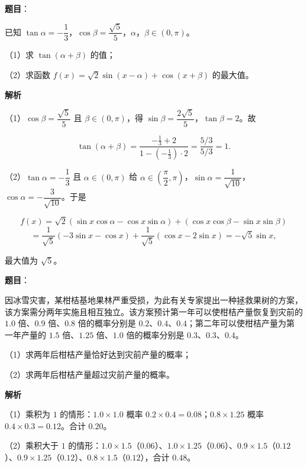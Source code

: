 \begin{answer}

\textbf{题目}：

已知 $\tan\alpha=-\dfrac13$，$\cos\beta=\dfrac{\sqrt5}5$，$\alpha$，$\beta\in(0,\pi)$。

（1）求 $\tan(\alpha+\beta)$ 的值；

（2）求函数 $f(x)=\sqrt2\sin(x-\alpha)+\cos(x+\beta)$ 的最大值。

\textbf{解析}

（1）$\cos\beta=\dfrac{\sqrt5}5$ 且 $\beta\in(0,\pi)$，得 $\sin\beta=\dfrac{2\sqrt5}5$，$\tan\beta=2$。故

\nopagebreak[4]
\[\tan(\alpha+\beta)=\frac{-\frac13+2}{1-\left(-\frac13\right)\cdot2}=\frac{5/3}{5/3}=1.\]

（2）$\tan\alpha=-\dfrac13$ 且 $\alpha\in(0,\pi)$ 给 $\alpha\in\left(\dfrac{\pi}2,\pi\right)$，$\sin\alpha=\dfrac1{\sqrt{10}}$，$\cos\alpha=-\dfrac3{\sqrt{10}}$。于是

\nopagebreak[4]
\[f(x)=\sqrt2(\sin x\cos\alpha-\cos x\sin\alpha)+(\cos x\cos\beta-\sin x\sin\beta)\]
\nopagebreak[4]
\[=\frac1{\sqrt5}(-3\sin x-\cos x)+\frac1{\sqrt5}(\cos x-2\sin x)=-\sqrt5\sin x,\]

最大值为 $\sqrt5$。


\end{answer}
\begin{answer}

\textbf{题目}：

因冰雪灾害，某柑桔基地果林严重受损，为此有关专家提出一种拯救果树的方案，该方案需分两年实施且相互独立。该方案预计第一年可以使柑桔产量恢复到灾前的 $1.0$ 倍、$0.9$ 倍、$0.8$ 倍的概率分别是 $0.2$、$0.4$、$0.4$；第二年可以使柑桔产量为第一年产量的 $1.5$ 倍、$1.25$ 倍、$1.0$ 倍的概率分别是 $0.3$、$0.3$、$0.4$。

（1）求两年后柑桔产量恰好达到灾前产量的概率；

（2）求两年后柑桔产量超过灾前产量的概率。

\textbf{解析}

（1）乘积为 $1$ 的情形：$1.0\times1.0$ 概率 $0.2\times0.4=0.08$；$0.8\times1.25$ 概率 $0.4\times0.3=0.12$。合计 $0.20$。

（2）乘积大于 $1$ 的情形：$1.0\times1.5$（$0.06$）、$1.0\times1.25$（$0.06$）、$0.9\times1.5$（$0.12$）、$0.9\times1.25$（$0.12$）、$0.8\times1.5$（$0.12$），合计 $0.48$。


\end{answer}
